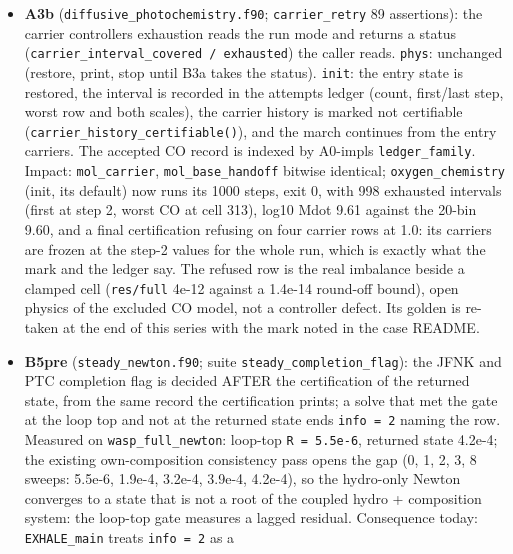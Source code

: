 \documentclass[english,a4paper]{my_memo}
\begin{document}
\begin{itemize}
  does not compile against the live tree (\texttt{no\_free} argument, another
  worker\textquotesingle s signature change; to fix at the next single build); the load
  average reached 38 with the parallel long runs, so future briefs pace the
  12000-step impact runs.
\item
  \textbf{A3b} (\texttt{diffusive\_photochemistry.f90}; \texttt{carrier\_retry} 89 assertions):
  the carrier controller\textquotesingle s exhaustion reads the run mode and returns a
  status (\texttt{carrier\_interval\_covered\ /\ exhausted}) the caller reads. \texttt{phys}:
  unchanged (restore, print, stop until B3a takes the status). \texttt{init}: the
  entry state is restored, the interval is recorded in the attempts ledger
  (count, first/last step, worst row and both scales), the carrier history
  is marked not certifiable (\texttt{carrier\_history\_certifiable()}), and the march
  continues from the entry carriers. The accepted CO record is indexed by
  A0-impl\textquotesingle s \texttt{ledger\_family}. Impact: \texttt{mol\_carrier}, \texttt{mol\_base\_handoff}
  bitwise identical; \texttt{oxygen\_chemistry} (init, its default) now runs its
  1000 steps, exit 0, with 998 exhausted intervals (first at step 2, worst
  CO at cell 313), log10 Mdot 9.61 against the 20-bin 9.60, and a final
  certification refusing on four carrier rows at 1.0: its carriers are
  frozen at the step-2 values for the whole run, which is exactly what the
  mark and the ledger say. The refused row is the real imbalance beside a
  clamped cell (\texttt{\textbar{}res\textbar{}/full} 4e-12 against a 1.4e-14 round-off bound), open
  physics of the excluded CO model, not a controller defect. Its golden is
  re-taken at the end of this series with the mark noted in the case
  README.
\item
  \textbf{B5pre} (\texttt{steady\_newton.f90}; suite \texttt{steady\_completion\_flag}): the JFNK
  and PTC completion flag is decided AFTER the certification of the returned
  state, from the same record the certification prints; a solve that met
  the gate at the loop top and not at the returned state ends \texttt{info\ =\ 2}
  naming the row. Measured on \texttt{wasp\_full\_newton}: loop-top \texttt{\textbar{}\textbar{}R\textbar{}\textbar{}\ =\ 5.5e-6},
  returned state 4.2e-4; the existing own-composition consistency pass
  opens the gap (0, 1, 2, 3, 8 sweeps: 5.5e-6, 1.9e-4, 3.2e-4, 3.9e-4,
  4.2e-4), so the hydro-only Newton converges to a state that is not a root
  of the coupled hydro + composition system: the loop-top gate measures a
  lagged residual. Consequence today: \texttt{EXHALE\_main} treats \texttt{info\ =\ 2} as a

\end{itemize}
\end{document}
